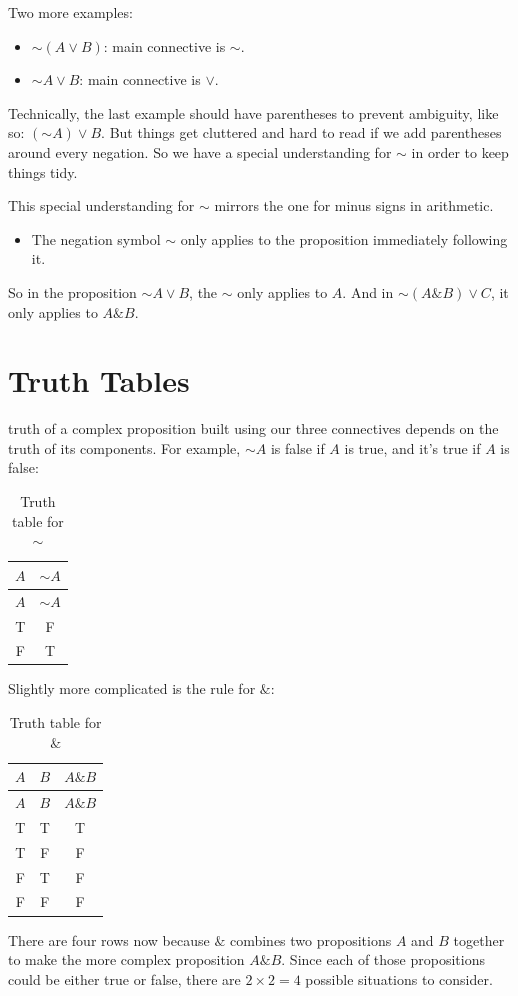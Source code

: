 \documentclass[justified]{tufte-book}
\providecommand{\tightlist}{%
  \setlength{\itemsep}{0pt}\setlength{\parskip}{0pt}}
\renewcommand{\neg}{\mathbin{\sim}}
\renewcommand{\wedge}{\mathbin{\&}}
\newenvironment{info}{\begin{itemize}\item[\Info]}{\end{itemize}}
\theoremstyle{definition}
\theoremstyle{definition}
\theoremstyle{definition}
\theoremstyle{remark}
\begin{document}
Two more examples:

\begin{itemize}
\tightlist
\item
  \(\neg (A \vee B)\): main connective is \(\neg\).
\item
  \(\neg A \vee B\): main connective is \(\vee\).
\end{itemize}

Technically, the last example should have parentheses to prevent ambiguity, like so: \((\neg A) \vee B\). But things get cluttered and hard to read if we add parentheses around every negation. So we have a special understanding for \(\neg\) in order to keep things tidy.

\begin{marginfigure}
This special understanding for \(\mathbin{\sim}\) mirrors the one for
minus signs in arithmetic.
\end{marginfigure}

\begin{info}
The negation symbol \(\mathbin{\sim}\) only applies to the proposition
immediately following it.
\end{info}

So in the proposition \(\neg A \vee B\), the \(\neg\) only applies to \(A\). And in \(\neg (A \wedge B) \vee C\), it only applies to \(A \wedge B\).

\hypertarget{truth-tables-1}{%
\section{Truth Tables}\label{truth-tables-1}}

 truth of a complex proposition built using our three connectives depends on the truth of its components. For example, \(\neg A\) is false if \(A\) is true, and it's true if \(A\) is false:

\begin{longtable}[]{@{}cc@{}}
\caption{\label{tab:unnamed-chunk-29}Truth table for \(\neg\)}\tabularnewline
\toprule
\(A\) & \(\neg A\)\tabularnewline
\midrule
\endfirsthead
\toprule
\(A\) & \(\neg A\)\tabularnewline
\midrule
\endhead
T & F\tabularnewline
F & T\tabularnewline
\bottomrule
\end{longtable}

Slightly more complicated is the rule for \(\&\):
\begin{longtable}[]{@{}ccc@{}}
\caption{\label{tab:unnamed-chunk-30}Truth table for \(\wedge\)}\tabularnewline
\toprule
\(A\) & \(B\) & \(A \wedge B\)\tabularnewline
\midrule
\endfirsthead
\toprule
\(A\) & \(B\) & \(A \wedge B\)\tabularnewline
\midrule
\endhead
T & T & T\tabularnewline
T & F & F\tabularnewline
F & T & F\tabularnewline
F & F & F\tabularnewline
\bottomrule
\end{longtable}
\noindent There are four rows now because \(\&\) combines two propositions \(A\) and \(B\) together to make the more complex proposition \(A \& B\). Since each of those propositions could be either true or false, there are \(2 \times 2 = 4\) possible situations to consider.
\end{document}
